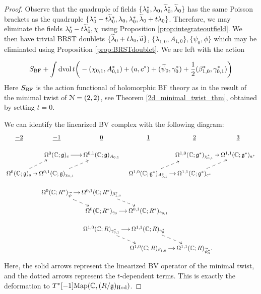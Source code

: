 \documentclass[10pt, oneside]{article}
\begin{document}
\begin{proof}
Observe that the quadruple of fields $\{\lambda_0^*, \lambda_0, \Tilde{\lambda}_0^*, \Tilde{\lambda}_0\}$ has the same Poisson brackets as the quadruple $\{\lambda_0^* - t \Tilde{\lambda}_0^*, \lambda_0, \lambda_0^*, \Tilde{\lambda}_0 + t \lambda_0\}$. 
Therefore, we may eliminate the fields $\lambda_0^*-t\wt\lambda_0^*, \chi$ using Proposition \ref{prop:integrateoutfield}. 
We then have trivial BRST doublets $\{\wt\lambda_0 + t\lambda_0, \wt a\}$, $\{\lambda_{1,0}, A_{1,0}\}, \{\psi_0, \phi\}$ which may be eliminated using Proposition \ref{prop:BRSTdoublet}. We are left with the action

\[
S_{\mr{BF}} + \int \dvol t \bigg( -(\chi_{0,1}, A_{0,1}^*) + (a, c^*) + (\Tilde{\psi}_0, \gamma_0^*) + \frac{1}{2} (\beta_{1,0}^*, \gamma_{0,1}^*) \bigg) 
\]
Here $S_{\mr{BF}}$ is the action functional of holomorphic BF theory as in the result of the minimal twist of $\cN=(2,2)$, see Theorem \ref{2d_minimal_twist_thm}, obtained by setting $t = 0$. 

We can identify the linearized BV complex with the following diagram:
\[\xymatrix@R=0.4cm@C=0.2cm{
\ul{-2} & \ul{-1} & \ul{0} & \ul{1} & \ul{2} & \ul{3} \\
&\Omega^0(\CC; \gg)_{c} \ar[r] &\Omega^{0,1}(\CC; \gg)_{A_{0,1}} & & \Omega^{1,0}(\CC; \gg^*)_{\chi_{0,1}^*} \ar[r] &\Omega^{1,1}(\CC; \gg^*)_{a^*} \\
\Omega^0(\CC; \gg)_{a} \ar[r] \ar@{-->}[ur] &\Omega^{0,1}(\CC; \gg)_{\chi_{0,1}} \ar@{-->}[ur] && \Omega^{1,0}(\CC; \gg^*)_{A_{0,1}^*} \ar[r] \ar@{-->}[ur] &\Omega^{1,1}(\CC; \gg^*)_{c^*} \ar@{-->}[ur]\\
&\Omega^0(\CC; R^*)_{\Tilde{\psi}} \ar[r] \ar@{-->}[dr] &\Omega^{0,1}(\CC; R^*)_{\beta_{1,0}^*} \ar@{-->}[dr] &&&\\
&& \Omega^0(\CC; R^*)_{\gamma_0} \ar[r]  &\Omega^{0,1}(\CC; R^*)_{\gamma_{0,1}} &&\\
&&\Omega^{1,0}(\CC; R)_{\gamma_{0,1}^*} \ar[r] \ar@{-->}[dr] &\Omega^{1,1}(\CC;  R)_{\gamma_0^*} \ar@{-->}[dr] &&\\
&&& \Omega^{1,0}(\CC; R)_{\beta_{1,0}} \ar[r]  &\Omega^{1,1}(\CC; R)_{\Tilde{\psi}_0^*}. &\\
}\]
Here, the solid arrows represent the linearized BV operator of the minimal twist, and the dotted arrows represent the $t$-dependent terms.
This is exactly the deformation to $T^*[-1]\mr{Map}(\CC, (R/\gg)_{\mr{Hod}})$.
\end{proof}
\end{document}
